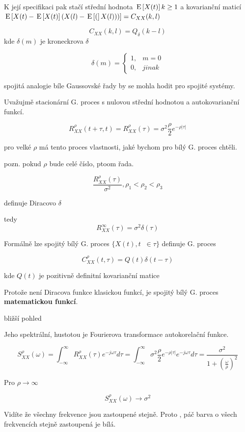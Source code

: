 K její specifikaci pak stačí střední hodnota $\,\mathrm{E}\left[X(t)\right] k \geq 1$ a kovarianční maticí $\,\mathrm{E}\left[X(t) - \,\mathrm{E}\left[X(t)\right]  (X(l) - \,\mathrm{E}\left[(\right]X(l)) )\right] = C_{XX} (k,l)$

\[ C_{XX} (k,l) = Q_ \delta (k-l) \] kde $\delta(m)$ je kroneckrova $\delta$

\[ \delta(m) = \begin{cases} 1, & m = 0 \\ 0, & jinak \end{cases} \]

spojitá analogie bíle Gaussovské řady by se mohla hodit pro spojité systémy.

Uvažujmě stacionární G. proces s nulovou střední hodnotou a autokovarianční funkcí.

\[ R_{XX}^\rho (t + \tau, t) = R_{XX}^\rho (\tau) = \sigma^2 \dfrac{\rho}{2} e^{-\rho |\tau|} \]

pro velké $\rho$ má tento proces vlastnosti, jaké bychom pro bílý G. proces chtěli.

pozn. pokud $\rho$ bude celé číslo, ptoom řada.

\[ { \dfrac{R_{XX}^\rho(\tau)}{\sigma^2} , \rho_1 <\rho_2 <\rho_3 } \]

definuje Diracovo $\delta$

tedy \[ R_{XX}^\infty (\tau) = \sigma^2 \delta (\tau) \]

Formálně lze spojitý bílý G. proces $\{ X(t), t \;\; \in \tau \}$ definuje G. proces

\[ C_{XX}^\rho (t,\tau) = Q(t) \delta(t-\tau) \]

kde $Q(t)$ je pozitivně definitní kovarianční matice

Protože není Diracova funkce klasickou funkcí, je spojitý bílý G. proces \textbf{matematickou funkcí}.

bližší pohled

Jeho spektrální, hustotou je Fourierova transformace autokorelační funkce.

\[ S_{XX}^\rho (\omega) = \int_{-\infty}^{\infty} R_{XX}^\rho (\tau) e^{-j \omega \tau} d \tau  = \int_{-\infty}^{\infty} \sigma^2 \dfrac{\rho}{2} e^{-\rho |\tau|} e^{-j \omega \tau} d \tau = \dfrac{\sigma^2}{1+(\frac{\omega}{\rho})^2} \]


Pro $\rho \to \infty$

\[ S_{XX}^\rho (\omega) \to \sigma^2 \]

Vidíte že všechny frekvence jsou zastoupené stejně. Proto , páč barva o všech frekvencích stejně zastoupená je bílá.


